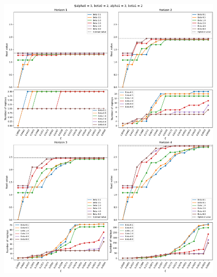 \documentclass{article}
\begin{document}
\begin{figure}[ht!]
    \centering
    \includegraphics[width=1\textwidth]{../data/convergence/xi/alpha05_beta02_alpha13_beta12_complete.png}
\end{figure}
\end{document}
